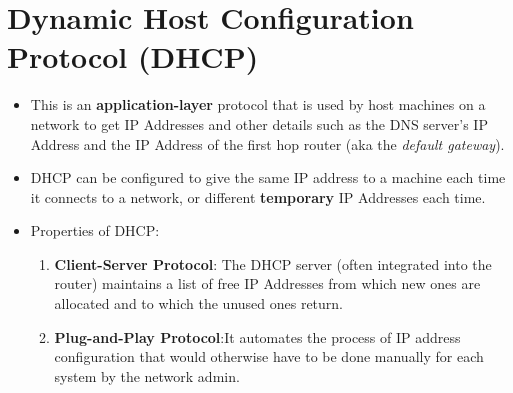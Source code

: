\documentclass[a4paper]{article}
\theoremstyle{plain}
\theoremstyle{definition}
\begin{document}
\section{Dynamic Host Configuration Protocol (DHCP)}
\begin{itemize}
    \item This is an \textbf{application-layer} protocol that is used by host machines on a network to get IP Addresses and other details such as the DNS server's IP Address and the IP Address of the first hop router (aka the \textit{default gateway}). 
    
    \item DHCP can be configured to give the same IP address to a machine each time it connects to a network, or different \textbf{temporary} IP Addresses each time. 
    
    \item Properties of DHCP:
    \begin{enumerate}
        \item \textbf{Client-Server Protocol}: The DHCP server (often integrated into the router) maintains a list of free IP Addresses from which new ones are allocated and to which the unused ones return. 
        
        \item \textbf{Plug-and-Play Protocol}:It automates the process of IP address configuration that would otherwise have to be done manually for each system by the network admin. 
    \end{enumerate}
\end{itemize}
\end{document}
